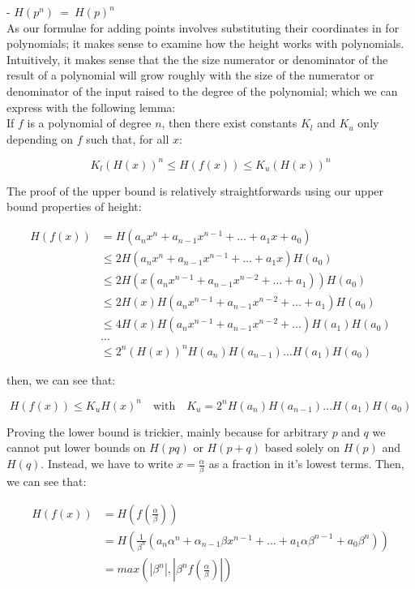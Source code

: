 \documentclass{article}
\begin{document}
- $ H(p^n) \ = \ H(p)^n $ \\

As our formulae for adding points involves substituting their coordinates in for polynomials; it makes sense to examine how the height works with polynomials. Intuitively, it makes sense that the the size numerator or denominator of the result of a polynomial will grow roughly with the size of the numerator or denominator of the input raised to the degree of the polynomial; which we can express with the following lemma:\\

If $f$ is a polynomial of degree $n$, then there exist constants $K_l$ and $K_u$ only depending on $f$ such that, for all $x$:

\[ K_l (H(x))^n \leq H(f(x)) \leq K_u (H(x))^n \]

The proof of the upper bound is relatively straightforwards using our upper bound properties of height:

\begin{align*} 
H(f(x)) &= H(a_n x^n + a_{n-1}x^{n-1} + \dots + a_1 x + a_0)\\
&\leq 2H(a_n x^n + a_{n-1}x^{n-1} + \dots + a_1 x)H(a_0)\\
&\leq 2H(x(a_n x^{n-1} + a_{n-1}x^{n-2} + \dots + a_1))H(a_0)\\
&\leq 2H(x)H(a_n x^{n-1} + a_{n-1}x^{n-2} + \dots + a_1)H(a_0)\\
&\leq 4H(x)H(a_n x^{n-1} + a_{n-1}x^{n-2} + \dots)H(a_1)H(a_0)\\
&\dots\\
&\leq 2^n (H(x))^n H(a_n)H(a_{n-1})\dots H(a_1)H(a_0)
\end{align*} 

then, we can see that:

\[ H(f(x)) \leq K_u H(x)^n \quad \text{with} \quad K_u = 2^n H(a_n)H(a_{n-1})\dots H(a_1)H(a_0) \]

Proving the lower bound is trickier, mainly because for arbitrary $p$ and $q$ we cannot put lower bounds on $H(pq)$ or $H(p + q)$ based solely on $H(p)$ and $H(q)$. Instead, we have to write $x = \frac{\alpha}{\beta}$ as a fraction in it's lowest terms. Then, we can see that:

\begin{align*}
    H(f(x)) &= H(f(\frac{\alpha}{\beta}))\\
            &= H(\frac{1}{\beta^n}(a_n \alpha^n + \alpha_{n-1} \beta x^{n-1} + \dots + a_1 \alpha \beta^{n-1} + a_0 \beta^n))\\
            &= max(|\beta^n|, |\beta^n f(\frac{\alpha}{\beta})|)\
\end{align*}
\end{document}
